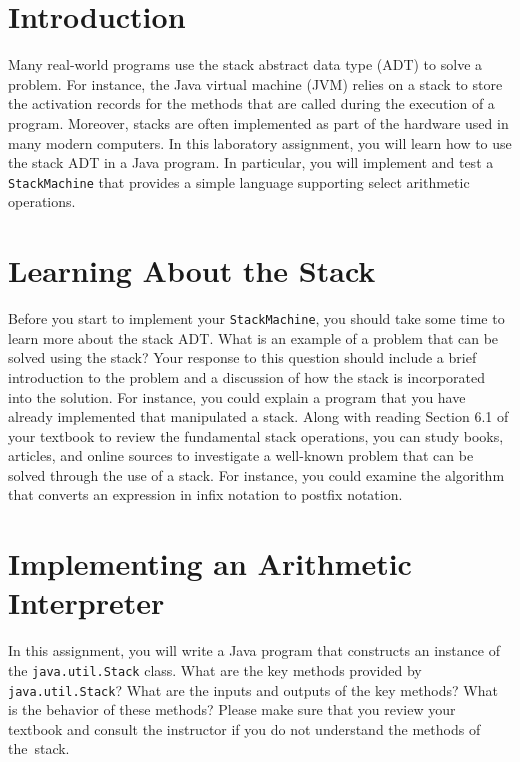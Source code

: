 

\usepackage[compact]{titlesec}


\section*{Introduction}

Many real-world programs use the stack abstract data type (ADT) to solve a problem.  For instance, the Java virtual
machine (JVM) relies on a stack to store the activation records for the methods that are called during the execution
of a program.  Moreover, stacks are often implemented as part of the hardware used in many modern computers. In this
laboratory assignment, you will learn how to use the stack ADT in a Java program.  In particular, you will implement
and test a {\tt StackMachine} that provides a simple language supporting select arithmetic operations.

\section*{Learning About the Stack}

Before you start to implement your {\tt StackMachine}, you should take some time to learn more about the stack ADT.
What is an example of a problem that can be solved using the stack? Your response to this question should include a
brief introduction to the problem and a discussion of how the stack is incorporated into the solution. For instance, you
could explain a program that you have already implemented that manipulated a stack. Along with reading Section 6.1 of
your textbook to review the fundamental stack operations, you can study books, articles, and online sources to
investigate a well-known problem that can be solved through the use of a stack. For instance, you could examine the
algorithm that converts an expression in infix notation to postfix notation.


\section*{Implementing an Arithmetic Interpreter}

In this assignment, you will write a Java program that constructs an instance of the {\tt java.util.Stack} class. What
are the key methods provided by {\tt java.util.Stack}? What are the inputs and outputs of the key methods? What is the
behavior of these methods? Please make sure that you review your textbook and consult the instructor if you do not
understand the methods of \mbox{the stack}.

